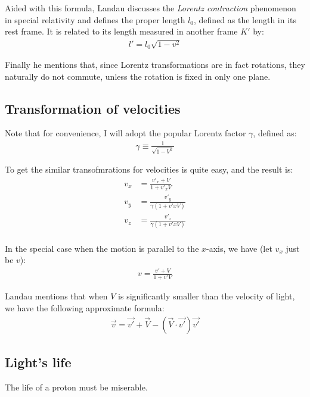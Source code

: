 \documentclass{article}
\numberwithin{equation}{subsection} %
\theoremstyle{definition}
\begin{document}
    Aided with this formula, Landau discusses the \textit{Lorentz
    contraction} phenomenon in special relativity and defines
    the proper length
    $l_0$, defined as the length in its rest frame. It is related
    to its length measured in another frame $K'$ by:
    \begin{align}
        l' = l_0 \sqrt{1-v^2}
    \end{align}

    Finally he mentions that, since Lorentz transformations are
    in fact rotations, they naturally do not commute, unless the
    rotation is fixed in only one plane.

    \subsection{Transformation of velocities}
    \label{sec:Transformation_of_velocities}
    
    Note that for convenience, I will adopt the popular Lorentz factor
    $\gamma$, defined as:
    \begin{align}
        \gamma \equiv \frac{1}{\sqrt{1-V^2}}
    \end{align}

    To get the similar transofmrations for velocities is quite easy,
    and the result is:
    \begin{align}
        v_x &= \frac{v'_x + V}{1+ v'_x V}\\
        v_y &= \frac{v'_y}{\gamma \left(1+v'x V\right)}\\
        v_z &= \frac{v'_z}{\gamma \left(1+v'x V\right)}\\
    \end{align}

    In the special case when the motion is parallel to the $x$-axis,
    we have (let $v_x$ just be $v$):
    \begin{align}
        v = \frac{v'+V}{1+v' V}
    \end{align}
    
    Landau mentions that when $V$ is significantly smaller than the
    velocity of light, we have the following approximate formula:
    \begin{align}
        \vec{v} = \vec{v'} + \vec{V} - (\vec{V}\cdot\vec{v'}) \vec{v'}
    \end{align}


    \subsection{Light's life}
    \label{sec:Lights_life}
    The life of a proton must be miserable.
    
\end{document}
